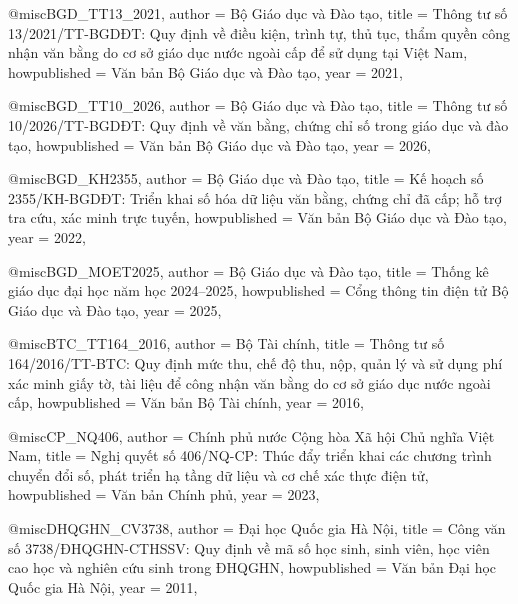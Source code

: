 

@misc{BGD_TT13_2021,
  author       = {{Bộ Giáo dục và Đào tạo}},
  title        = {Thông tư số 13/2021/{TT}-{BGDĐT}: Quy định về điều kiện, trình tự, thủ tục, thẩm quyền công nhận văn bằng do cơ sở giáo dục nước ngoài cấp để sử dụng tại Việt Nam},
  howpublished = {Văn bản Bộ Giáo dục và Đào tạo},
  year         = {2021},
}

@misc{BGD_TT10_2026,
  author       = {{Bộ Giáo dục và Đào tạo}},
  title        = {Thông tư số 10/2026/{TT}-{BGDĐT}: Quy định về văn bằng,
                  chứng chỉ số trong giáo dục và đào tạo},
  howpublished = {Văn bản Bộ Giáo dục và Đào tạo},
  year         = {2026},
}

@misc{BGD_KH2355,
  author       = {{Bộ Giáo dục và Đào tạo}},
  title        = {Kế hoạch số 2355/{KH}-{BGDĐT}: Triển khai số hóa dữ liệu
                  văn bằng, chứng chỉ đã cấp; hỗ trợ tra cứu, xác minh trực
                  tuyến},
  howpublished = {Văn bản Bộ Giáo dục và Đào tạo},
  year         = {2022},
}

@misc{BGD_MOET2025,
  author       = {{Bộ Giáo dục và Đào tạo}},
  title        = {Thống kê giáo dục đại học năm học 2024--2025},
  howpublished = {Cổng thông tin điện tử Bộ Giáo dục và Đào tạo},
  year         = {2025},
}

@misc{BTC_TT164_2016,
  author       = {{Bộ Tài chính}},
  title        = {Thông tư số 164/2016/{TT}-{BTC}: Quy định mức thu, chế độ
                  thu, nộp, quản lý và sử dụng phí xác minh giấy tờ, tài
                  liệu để công nhận văn bằng do cơ sở giáo dục nước ngoài
                  cấp},
  howpublished = {Văn bản Bộ Tài chính},
  year         = {2016},
}


@misc{CP_NQ406,
  author       = {{Chính phủ nước Cộng hòa Xã hội Chủ nghĩa Việt Nam}},
  title        = {Nghị quyết số 406/{NQ}-{CP}: Thúc đẩy triển khai các chương
                  trình chuyển đổi số, phát triển hạ tầng dữ liệu và cơ chế
                  xác thực điện tử},
  howpublished = {Văn bản Chính phủ},
  year         = {2023},
}


@misc{DHQGHN_CV3738,
  author       = {{Đại học Quốc gia Hà Nội}},
  title        = {Công văn số 3738/{ĐHQGHN}-{CTHSSV}: Quy định về mã số học
                  sinh, sinh viên, học viên cao học và nghiên cứu sinh trong
                  {ĐHQGHN}},
  howpublished = {Văn bản Đại học Quốc gia Hà Nội},
  year         = {2011},
}

